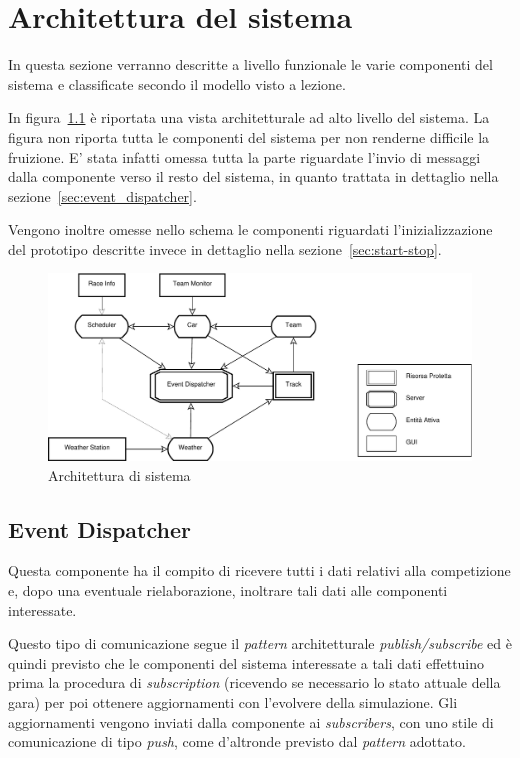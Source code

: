 \chapter{Architettura del sistema}
In questa sezione verranno descritte a livello funzionale le varie componenti del sistema e classificate secondo il modello visto a lezione.

In figura~\ref{fig:architettura} è riportata una vista architetturale ad alto livello del sistema. La figura non riporta tutta le componenti del sistema per non renderne difficile la fruizione. E' stata infatti omessa tutta la parte riguardate l'invio di messaggi dalla componente \evdisp{} verso il resto del sistema, in quanto trattata in dettaglio nella sezione~\ref{sec:event_dispatcher}.

Vengono inoltre omesse nello schema le componenti riguardati l'inizializzazione del prototipo descritte invece in dettaglio nella sezione~\ref{sec:start-stop}.
\begin{landscape}
\begin{figure}
\includegraphics[height=.33\paperheight]{diagrammi/Arch}
\caption{Architettura di sistema}
\label{fig:architettura}
\end{figure}
\end{landscape}

\section{Event Dispatcher}
\label{sec:dispatcherArch}
Questa componente ha il compito di ricevere tutti i dati relativi alla competizione e, dopo una eventuale rielaborazione, inoltrare tali dati alle componenti interessate.

Questo tipo di comunicazione segue il \textit{pattern} architetturale \textit{publish/subscribe} ed è quindi previsto che le componenti del sistema interessate a tali dati effettuino prima la procedura di \textit{subscription} (ricevendo se necessario lo stato attuale della gara) per poi ottenere aggiornamenti con l'evolvere della simulazione. Gli aggiornamenti vengono inviati dalla componente \evdisp{} ai \textit{subscribers}, con uno stile di comunicazione di tipo \textit{push}, come d'altronde previsto dal \textit{pattern} adottato.

